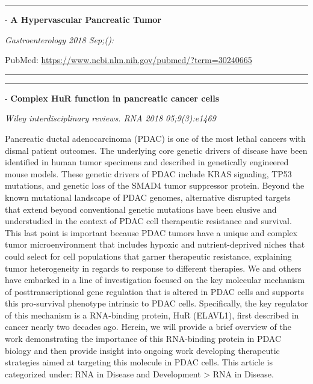 \documentclass[]{article}
\begin{document}
\begin{center}\rule{0.5\linewidth}{\linethickness}\end{center}

 - \textbf{A Hypervascular Pancreatic Tumor}

\emph{Gastroenterology 2018 Sep;():}

PubMed: \url{https://www.ncbi.nlm.nih.gov/pubmed/?term=30240665}

{}

{}

\begin{center}\rule{0.5\linewidth}{\linethickness}\end{center}

\begin{center}\rule{0.5\linewidth}{\linethickness}\end{center}

 - \textbf{Complex HuR function in pancreatic cancer cells}

\emph{Wiley interdisciplinary reviews. RNA 2018 05;9(3):e1469}

Pancreatic ductal adenocarcinoma (PDAC) is one of the most lethal
cancers with dismal patient outcomes. The underlying core genetic
drivers of disease have been identified in human tumor specimens and
described in genetically engineered mouse models. These genetic drivers
of PDAC include KRAS signaling, TP53 mutations, and genetic loss of the
SMAD4 tumor suppressor protein. Beyond the known mutational landscape of
PDAC genomes, alternative disrupted targets that extend beyond
conventional genetic mutations have been elusive and understudied in the
context of PDAC cell therapeutic resistance and survival. This last
point is important because PDAC tumors have a unique and complex tumor
microenvironment that includes hypoxic and nutrient-deprived niches that
could select for cell populations that garner therapeutic resistance,
explaining tumor heterogeneity in regards to response to different
therapies. We and others have embarked in a line of investigation
focused on the key molecular mechanism of posttranscriptional gene
regulation that is altered in PDAC cells and supports this pro-survival
phenotype intrinsic to PDAC cells. Specifically, the key regulator of
this mechanism is a RNA-binding protein, HuR (ELAVL1), first described
in cancer nearly two decades ago. Herein, we will provide a brief
overview of the work demonstrating the importance of this RNA-binding
protein in PDAC biology and then provide insight into ongoing work
developing therapeutic strategies aimed at targeting this molecule in
PDAC cells. This article is categorized under: RNA in Disease and
Development \textgreater{} RNA in Disease.
\end{document}
